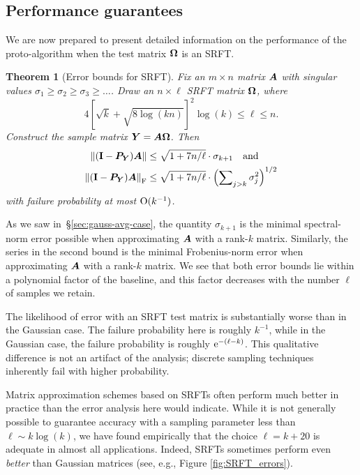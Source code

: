 \documentclass{article}
\newtheorem{theorem}{Theorem}
\begin{document}
\subsection{Performance guarantees}

We are now prepared to present detailed information on the
performance of the proto-algorithm when the test matrix
$\bm{\Omega}$ is an SRFT.

\lsp

\begin{theorem}[Error bounds for SRFT]
\label{thm:SRFT}
Fix an $m \times n$ matrix $\bm{A}$ with singular values
$\sigma_1 \geq \sigma_2 \geq \sigma_3 \geq \dots$.
Draw an $n \times \ell$ SRFT matrix $\bm{\Omega}$, where
$$
4 \left[\sqrt{k} + \sqrt{8\log(kn)} \right]^2 \log(k) \leq \ell \leq n.
$$
Construct the sample matrix $\bm{Y} = \bm{A\Omega}$. Then
\begin{align*}
\left\Vert { (\mathbf{I}- \bm{P}_{\bm{Y}}) \bm{A} } \right\Vert
    &\leq \sqrt{1 + 7n/\ell} \cdot \sigma_{k+1}  \quad\text{and} \\
 \left\Vert { (\mathbf{I}- \bm{P}_{\bm{Y}}) \bm{A} } \right\Vert_{\mathrm{F}}
    &\leq \sqrt{1 + 7n/\ell} \cdot \left( \sum\nolimits_{j > k} \sigma_j^2 \right)^{1/2}
\end{align*}
with failure probability at most $\mathrm{O}(k^{-1})$.
\end{theorem}

\lsp


As we saw in~\S\ref{sec:gauss-avg-case},
the quantity $\sigma_{k+1}$ is the minimal spectral-norm error possible
when approximating $\bm{A}$ with a rank-$k$ matrix.
Similarly, the series in the second bound
is the minimal Frobenius-norm error when approximating $\bm{A}$
with a rank-$k$ matrix.  We see that both error bounds
lie within a polynomial factor of the baseline, and this factor decreases
with the number $\ell$ of samples we retain.

The likelihood of error with an SRFT test matrix is substantially worse than
in the Gaussian case.  The failure probability here is roughly $k^{-1}$,
while in the Gaussian case, the failure probability is roughly $\mathrm{e}^{-(\ell - k)}$.
This qualitative difference is not an artifact of the analysis; discrete sampling techniques inherently fail with higher probability.

Matrix approximation schemes based on SRFTs often perform much better in practice
than the error analysis here would indicate. While it is not generally possible
to guarantee accuracy with a sampling parameter less than $\ell \sim k \log(k)$,
we have found empirically that the choice $\ell = k+20$ is adequate
in almost all applications. Indeed, SRFTs sometimes perform even \textit{better}
than Gaussian matrices (see, e.g., Figure \ref{fig:SRFT_errors}).
\end{document}

